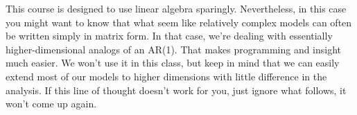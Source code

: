 \documentclass[11pt]{exam}
\begin{document}
\begin{questions}
\begin{solution}
This course is designed to use linear algebra sparingly.
Nevertheless, in this case you might want to know
that what seem like relatively complex models can often
be written simply in matrix form.
In that case, we're dealing with essentially higher-dimensional
analogs of an AR(1).
That makes programming and insight much easier.
We won't use it in this class,
but keep in mind that we can easily extend most of our models
to higher dimensions with little difference in the analysis.
If this line of thought doesn't work for you,
just ignore what follows, it won't come up again.

\end{solution}
\end{questions}
\end{document}

